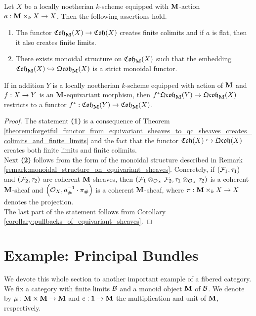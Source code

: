 \begin{corollary}\label{corollary:coherent_equivariant_sheaves_properties}
Let $X$ be a locally noetherian $k$-scheme equipped with $\mathbf{M}$-action $a:\mathbf{M}\times_kX\rightarrow X$. Then the following assertions hold.
\begin{enumerate}[label= \emph{\textbf{(\arabic*)}}, leftmargin=3.0em]
\item The functor $\mathfrak{Coh}_{\mathbf{M}}(X)\rightarrow \mathfrak{Coh}(X)$ creates finite colimits and if $a$ is flat, then it also creates finite limits.
\item There exists monoidal structure on $\mathfrak{Coh}_{\mathbf{M}}(X)$ such that the embedding $\mathfrak{Coh}_{\mathbf{M}}(X)\hookrightarrow \mathfrak{Qcoh}_{\mathbf{M}}(X)$ is a strict monoidal functor.
\end{enumerate}
If in addition $Y$ is a locally noetherian $k$-scheme equipped with action of $\mathbf{M}$ and $f:X\rightarrow Y$ is an $\mathbf{M}$-equivariant morphism, then $f^*\mathfrak{Qcoh}_{\mathbf{M}}(Y)\rightarrow \mathfrak{Qcoh}_{\mathbf{M}}(X)$ restricts to a functor $f^*:\mathfrak{Coh}_{\mathbf{M}}(Y)\rightarrow \mathfrak{Coh}_{\mathbf{M}}(X)$.
\end{corollary}
\begin{proof}
The statement \textbf{(1)} is a consequence of Theorem \ref{theorem:forgetful_functor_from_equivariant_sheaves_to_qc_sheaves_creates_colimits_and_finite_limits} and the fact that the functor $\mathfrak{Coh}(X)\hookrightarrow \mathfrak{Qcoh}(X)$ creates both finite limits and finite colimits.\\
Next \textbf{(2)} follows from the form of the monoidal structure described in Remark \ref{remark:monoidal_structure_on_equivariant_sheaves}. Concretely, if $({\mathcal F}_1,\tau_1)$ and $({\mathcal F}_2,\tau_2)$ are coherent $\mathbf{M}$-sheaves, then $\left({\mathcal F}_1\otimes_{{\mathcal O}_X}{\mathcal F}_2,\tau_1\otimes_{{\mathcal O}_X}\tau_2\right)$ is a coherent $\mathbf{M}$-sheaf and $\left({\mathcal O}_X,a_{\#}^{-1}\cdot \pi_{\#}\right)$ is a coherent $\mathbf{M}$-sheaf, where $\pi:\mathbf{M}\times_kX\rightarrow X$ denotes the projection.\\
The last part of the statement follows from Corollary \ref{corollary:pullbacks_of_equivariant_sheaves}.
\end{proof}

\section{Example: Principal Bundles}
\noindent
We devote this whole section to another important example of a fibered category. We fix a category with finite limits ${\mathcal B}$ and a monoid object $\mathbf{M}$ of ${\mathcal B}$. We denote by $\mu:\mathbf{M}\times \mathbf{M}\rightarrow \mathbf{M}$ and $e:\mathbf{1}\rightarrow \mathbf{M}$ the multiplication and unit of $\mathbf{M}$, respectively.

